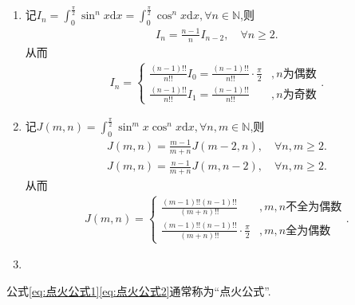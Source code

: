 \documentclass[../../main.tex]{subfiles}
\begin{document}
\begin{enumerate}
\item 记$I_n=\int_0^{\frac{\pi}{2}}\sin^n x\mathrm{d}x=\int_0^{\frac{\pi}{2}}\cos^n x\mathrm{d}x,\forall n\in \mathbb{N}$,则
\begin{align*}
I_n=\frac{n-1}{n}I_{n-2},\quad \forall n\geqslant 2.
\end{align*}
从而
\begin{align}\label{eq:点火公式1}
I_n=
\begin{cases}
\frac{(n-1)!!}{n!!}I_0=\frac{(n-1)!!}{n!!}\cdot \frac{\pi}{2}&,n\text{为偶数}\\
\frac{(n-1)!!}{n!!}I_1=\frac{(n-1)!!}{n!!}&,n\text{为奇数}
\end{cases}.
\end{align}

\item 记$J(m,n)=\int_0^{\frac{\pi}{2}}\sin^m x\cos^n x\mathrm{d}x,\forall n,m\in \mathbb{N}$,则
\begin{align*}
J(m,n)=\frac{m-1}{m+n}J(m-2,n),\quad \forall n,m\geqslant 2.
\end{align*}
\begin{align*}
J(m,n)=\frac{n-1}{m+n}J(m,n-2),\quad \forall n,m\geqslant 2.
\end{align*}
从而
\begin{align}\label{eq:点火公式2}
J(m,n)=
\begin{cases}
\frac{(m-1)!!(n-1)!!}{(m+n)!!}&,m,n\text{不全为偶数}\\
\frac{(m-1)!!(n-1)!!}{(m+n)!!}\cdot \frac{\pi}{2}&,m,n\text{全为偶数}
\end{cases}.
\end{align}

\item 
\end{enumerate}
\begin{remark}
公式\eqref{eq:点火公式1}\eqref{eq:点火公式2}通常称为“点火公式”.
\end{remark}
\end{document}

